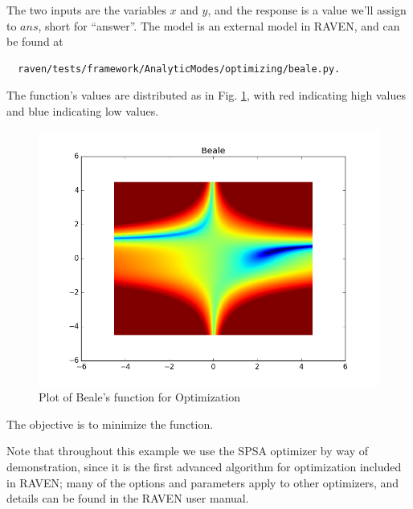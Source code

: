 The two inputs are the variables $x$ and $y$, and the response is a value we'll assign to $ans$, short for
``answer''.  The model is an external model in RAVEN, and can be found at
\begin{verbatim}
  raven/tests/framework/AnalyticModes/optimizing/beale.py.
\end{verbatim}
The function's values are distributed as in Fig. \ref{fig:beale}, with red indicating high values
and blue indicating low values.
\begin{figure}[h!]
  \centering
  \includegraphics[scale=0.7]{../../tests/framework/user_guide/optimizing/Beale_grid.png}
  \caption{Plot of Beale's function for Optimization}
  \label{fig:beale}
\end{figure}
The objective is to minimize the function.

Note that throughout this example we use the SPSA optimizer by way of demonstration, since it is the first
advanced algorithm for optimization included in RAVEN; many of the options and parameters apply to other
optimizers, and details can be found in the RAVEN user manual.

